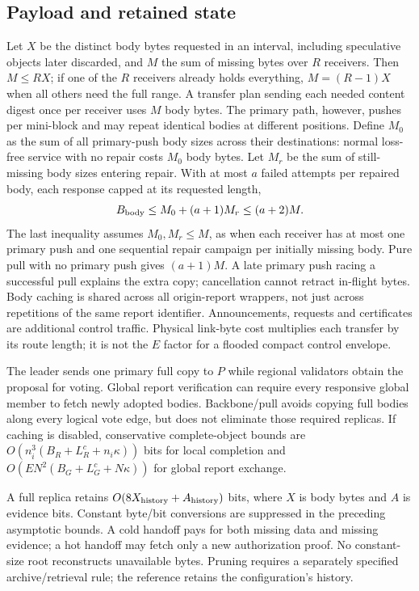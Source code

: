\documentclass[11pt,a4paper,onecolumn]{article}
\theoremstyle{remark}\newtheorem{example}[definition]{Example}
\begin{document}
\subsection{Payload and retained state}\label{sec:payloadcost}
Let $X$ be the distinct body bytes requested in an interval, including speculative
objects later discarded, and $M$ the sum of missing bytes over $R$ receivers.
Then $M\leq RX$; if one of the $R$ receivers already holds everything,
$M=(R-1)X$ when all others need the full range. A transfer plan sending each
needed content digest once per receiver uses $M$ body bytes. The primary path,
however, pushes per mini-block and may repeat identical bodies at different
positions. Define $M_0$ as the sum of all primary-push body sizes across their
destinations: normal loss-free service with no repair costs $M_0$ body bytes.
Let $M_r$ be the sum of still-missing
body sizes entering repair. With at most $a$ failed attempts per repaired body,
each response capped at its requested length,
\begin{equation}\label{eq:payload}
 B_{\rm body}\leq M_0+(a+1)M_r\leq(a+2)M.
\end{equation}
The last inequality assumes $M_0,M_r\leq M$, as when each receiver has at most
one primary push and one sequential repair campaign per initially missing body.
Pure pull with no primary push gives $(a+1)M$. A late primary push racing a
successful pull explains the extra copy; cancellation cannot retract in-flight
bytes. Body caching is shared across all origin-report wrappers, not just
across repetitions of the same report identifier.
Announcements, requests and certificates are additional control traffic.
Physical link-byte cost multiplies each transfer by its route length; it is
not the $E$ factor for a flooded compact control envelope.

The leader sends one primary full copy to $P$ while regional validators obtain
the proposal for voting. Global report verification can require every responsive
global member to fetch newly adopted bodies. Backbone/pull avoids copying full
bodies along every logical vote edge, but does not eliminate those required
replicas. If caching is disabled, conservative complete-object bounds are
$O(n_i^3(B_R+L_R^c+n_i\kappa))$ bits for local completion and
$O(EN^2(B_G+L_G^c+N\kappa))$ for global report exchange.

A full replica retains $O(8X_{\rm history}+A_{\rm history})$ bits, where $X$ is
body bytes and $A$ is evidence bits. Constant byte/bit conversions are suppressed
in the preceding asymptotic bounds. A cold handoff pays for
both missing data and missing evidence; a hot handoff may fetch only a new
authorization proof. No constant-size root reconstructs unavailable bytes.
Pruning requires a separately specified archive/retrieval rule; the reference
retains the configuration's history.
\end{document}
